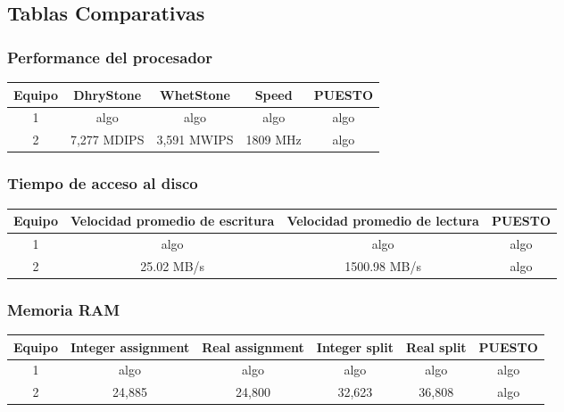 \subsection{Tablas Comparativas}

\subsubsection{Performance del procesador}
\begin{center}
\begin{tabular}{|ccccc|} \hline
\footnotesize\textbf{Equipo} & \footnotesize\textbf{DhryStone} & \footnotesize\textbf{WhetStone} & \footnotesize\textbf{Speed} & \footnotesize\textbf{PUESTO} \\\hline
1 & algo & algo & algo & algo \\\hline
2 & 7,277 MDIPS & 3,591 MWIPS & 1809 MHz & algo \\\hline
\end{tabular}
\end{center}

\subsubsection{Tiempo de acceso al disco}
\begin{center}
\begin{tabular}{|cccc|} \hline
\footnotesize\textbf{Equipo} & \footnotesize\textbf{Velocidad promedio de escritura} & \footnotesize\textbf{Velocidad promedio de lectura} & \footnotesize\textbf{PUESTO} \\\hline
1 & algo & algo & algo \\\hline
2 & 25.02 MB/s & 1500.98 MB/s & algo \\\hline
\end{tabular}
\end{center}

\subsubsection{Memoria RAM}
\begin{center}
\begin{tabular}{|cccccc|} \hline
\footnotesize\textbf{Equipo} & \footnotesize\textbf{Integer assignment} & \footnotesize\textbf{Real assignment} & \footnotesize\textbf{Integer split} & \footnotesize\textbf{Real split} & \footnotesize\textbf{PUESTO} \\\hline
1 & algo & algo & algo & algo & algo \\\hline
2 & 24,885 & 24,800 & 32,623 & 36,808 & algo \\\hline
\end{tabular}
\end{center}

